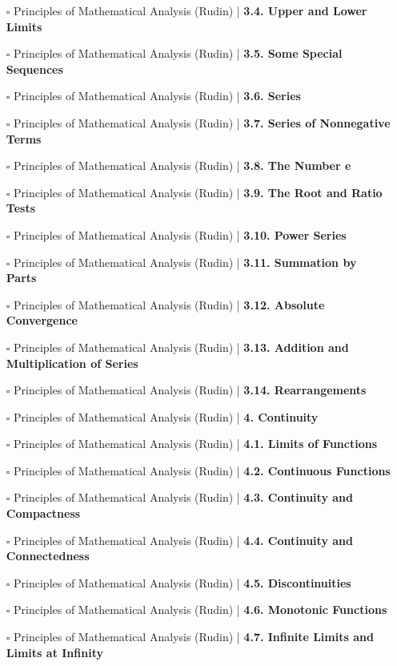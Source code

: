 \documentclass[a4, landscape, 12pt]{article}
\newcommand{\checkbox}{$\square$}%
\begin{document}
\begin{itemize}
{}
\item [\checkbox] Principles of Mathematical Analysis (Rudin)  | \textbf{3.4. Upper and Lower Limits
}
\item [\checkbox] Principles of Mathematical Analysis (Rudin)  | \textbf{3.5. Some Special Sequences
}
\item [\checkbox] Principles of Mathematical Analysis (Rudin)  | \textbf{3.6. Series
}
\item [\checkbox] Principles of Mathematical Analysis (Rudin)  | \textbf{3.7. Series of Nonnegative Terms
}
\item [\checkbox] Principles of Mathematical Analysis (Rudin)  | \textbf{3.8. The Number e
}
\item [\checkbox] Principles of Mathematical Analysis (Rudin)  | \textbf{3.9. The Root and Ratio Tests
}
\item [\checkbox] Principles of Mathematical Analysis (Rudin)  | \textbf{3.10. Power Series
}
\item [\checkbox] Principles of Mathematical Analysis (Rudin)  | \textbf{3.11. Summation by Parts
}
\item [\checkbox] Principles of Mathematical Analysis (Rudin)  | \textbf{3.12. Absolute Convergence
}
\item [\checkbox] Principles of Mathematical Analysis (Rudin)  | \textbf{3.13. Addition and Multiplication of Series
}
\item [\checkbox] Principles of Mathematical Analysis (Rudin)  | \textbf{3.14. Rearrangements
}
\item [\checkbox] Principles of Mathematical Analysis (Rudin)  | \textbf{4. Continuity
}
\item [\checkbox] Principles of Mathematical Analysis (Rudin)  | \textbf{4.1. Limits of Functions
}
\item [\checkbox] Principles of Mathematical Analysis (Rudin)  | \textbf{4.2. Continuous Functions
}
\item [\checkbox] Principles of Mathematical Analysis (Rudin)  | \textbf{4.3. Continuity and Compactness
}
\item [\checkbox] Principles of Mathematical Analysis (Rudin)  | \textbf{4.4. Continuity and Connectedness
}
\item [\checkbox] Principles of Mathematical Analysis (Rudin)  | \textbf{4.5. Discontinuities
}
\item [\checkbox] Principles of Mathematical Analysis (Rudin)  | \textbf{4.6. Monotonic Functions
}
\item [\checkbox] Principles of Mathematical Analysis (Rudin)  | \textbf{4.7. Infinite Limits and Limits at Infinity
}
\end{itemize}
\end{document}
